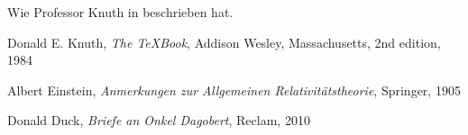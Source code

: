 \documentclass[12pt,ngerman]{scrartcl}
\begin{document}
\blinddocument

Wie Professor Knuth in \cite{knuth} beschrieben hat.

\begin{thebibliography}{9}
 Donald E. Knuth, \textit{The \TeX Book}, Addison Wesley, Massachusetts, 2nd edition, 1984 

 Albert Einstein, \textit{Anmerkungen zur Allgemeinen Relativitätstheorie}, Springer, 1905

 Donald Duck, \textit{Briefe an Onkel Dagobert}, Reclam, 2010


\end{thebibliography}
\end{document}
